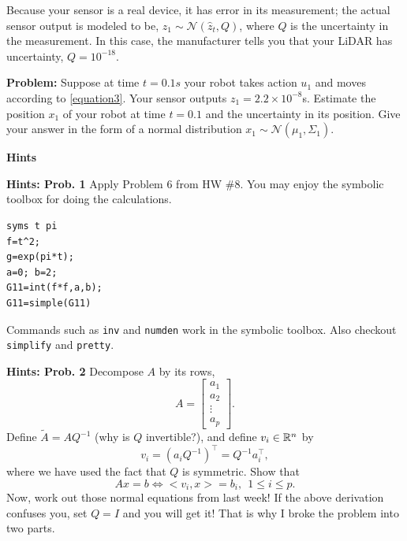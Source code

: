 \documentclass[letterpaper]{article}
\begin{document}
\begin{enumerate}
Because your sensor is a real device, it has error in its measurement; the actual sensor output is modeled to be, $z_1 \sim \mathcal{N}(\hat z_t, Q)$, where $Q$ is the uncertainty in the measurement. In this case, the manufacturer tells you that your LiDAR has uncertainty, $Q=10^{-18}$.

\textbf{Problem:} Suppose at time $t=0.1s$ your robot takes action $u_1$ and moves according to \eqref{equation3}. Your sensor outputs  $z_1 = 2.2 \times 10^{-8}$s. Estimate the position $x_1$ of your robot at time $t=0.1$ and the uncertainty in its position. Give your answer in the form of a normal distribution $ x_1 \sim \mathcal{N}(\mu_1, \Sigma_1)$.

%
%
%

\end{enumerate}

\newpage

\begin{center}
{\bf Hints}
\end{center}
\noindent \textbf{Hints: Prob. 1 } Apply Problem 6 from HW \#8. You may enjoy the symbolic toolbox for doing the calculations.
\begin{verbatim}
syms t pi
f=t^2;
g=exp(pi*t);
a=0; b=2;
G11=int(f*f,a,b);
G11=simple(G11)
\end{verbatim}
Commands such as \texttt{inv} and \texttt{numden} work in the symbolic toolbox. Also checkout \texttt{simplify} and \texttt{pretty}.

\vspace{1cm}
\noindent \textbf{Hints: Prob. 2 }  Decompose $A$ by its rows,
 $$A= \left[\begin{array}{c} a_1 \\ a_2 \\ \vdots \\ a_p\end{array} \right].$$
Define $\tilde{A} = A Q^{-1}$ (why is $Q$ invertible?), and define $v_i \in \mathbb R^n$ by
$$v_i = (a_i Q^{-1})^\top = Q^{-1} a_i^\top,$$
where we have used the fact that $Q$ is symmetric. Show that
$$Ax=b \Leftrightarrow <v_i,x> = b_i,~~  1\le i \le p.$$
Now, work out those normal equations from last week! If the above derivation confuses you, set $Q=I$ and you will get it! That is why I broke the problem into two parts.\\
\end{document}
